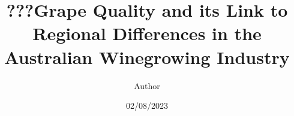 \documentclass[review,12pt,authoryear]{elsarticle}
\begin{document}
\begin{linenumbers}
\begin{frontmatter}




\title{???Grape Quality and its Link to Regional Differences in the Australian Winegrowing Industry}


\author[label1,label2,label3]{Author}
\date{02/08/2023}

\begin{abstract}
\end{abstract}


\end{frontmatter}
\end{linenumbers}
\end{document}
